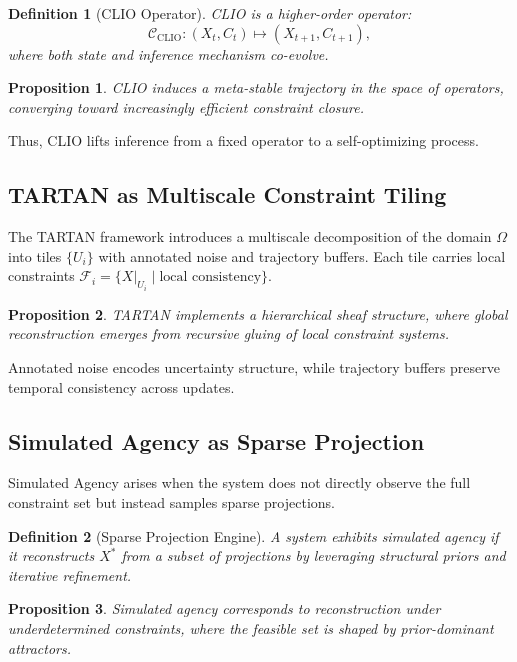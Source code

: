 \documentclass[12pt]{article}
\newtheorem{definition}{Definition}
\newtheorem{proposition}{Proposition}
\begin{document}
\begin{definition}[CLIO Operator]
CLIO is a higher-order operator:
\[
\mathcal{C}_{\mathrm{CLIO}} : (X_t, C_t) \mapsto (X_{t+1}, C_{t+1}),
\]
where both state and inference mechanism co-evolve.
\end{definition}

\begin{proposition}
CLIO induces a meta-stable trajectory in the space of operators, converging toward increasingly efficient constraint closure.
\end{proposition}

Thus, CLIO lifts inference from a fixed operator to a self-optimizing process.

\subsection{TARTAN as Multiscale Constraint Tiling}

The TARTAN framework introduces a multiscale decomposition of the domain $\Omega$ into tiles $\{U_i\}$ with annotated noise and trajectory buffers. Each tile carries local constraints $\mathcal{F}_i = \{ X|_{U_i} \mid \text{local consistency} \}$.

\begin{proposition}
TARTAN implements a hierarchical sheaf structure, where global reconstruction emerges from recursive gluing of local constraint systems.
\end{proposition}

Annotated noise encodes uncertainty structure, while trajectory buffers preserve temporal consistency across updates.

\subsection{Simulated Agency as Sparse Projection}

Simulated Agency arises when the system does not directly observe the full constraint set but instead samples sparse projections.

\begin{definition}[Sparse Projection Engine]
A system exhibits simulated agency if it reconstructs $X^*$ from a subset of projections by leveraging structural priors and iterative refinement.
\end{definition}

\begin{proposition}
Simulated agency corresponds to reconstruction under underdetermined constraints, where the feasible set is shaped by prior-dominant attractors.
\end{proposition}
\end{document}
